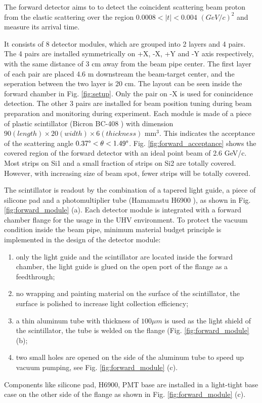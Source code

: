 \documentclass[number,5p]{elsarticle}
\begin{document}
The forward detector aims to to detect the coincident scattering beam proton
from the elastic scattering over the region \(0.0008 < |t| < 0.004\)
\((GeV/c)^2\) and measure its arrival time.

It consists of 8 detector modules, which are grouped into 2 layers and 4 pairs.
The 4 pairs are installed symmetrically on +X, -X, +Y and -Y axis respectively, with the same distance of 3
cm away from the beam pipe center.
The first layer of each pair are placed 4.6 m downstream the
beam-target center, and the seperation between the two layer is 20 cm.
The layout can be seen inside the forward chamber in Fig. \ref{fig:setup}.
Only the pair on -X is used for conincidence detection.
The other 3 pairs are installed for beam position tuning during beam preparation and monitoring during experiment.
Each module is made of a piece of plastic scintillator (Bicron BC-408
\cite{bc408}) with dimension \(90 (length) \times 20 (width) \times 6 (thickness)\) mm$^3$.
This indicates the acceptance of the scattering angle \(0.37\degree < \theta < 1.49\degree\).
Fig. \ref{fig:forward_acceptance} shows the covered region of the forward detector with an ideal point beam of 2.6 GeV/c.
Most strips on Si1 and a small fraction of strips on Si2 are totally covered. However, with increasing size of beam spot, fewer strips will be totally covered.

The scintillator is readout by the combination of a tapered light guide, a piece of silicone pad and a
photomultiplier tube (Hamamastu H6900 \cite{hamamatsu}), as shown in Fig. \ref{fig:forward_module} (a).
Each detector module is integrated with a forward chamber flange for the usage
in the UHV environment.
To protect the vacuum condition inside the beam pipe, minimum material budget principle is implemented in the design of the detector module:
\begin{enumerate}
\item only the light guide and the scintillator are located inside the forward chamber, the light guide is glued on the open port of the flange as a feedthrough;
\item no wrapping and painting material on the surface of the scintillator, the surface is polished to increase light collection efficiency;
\item a thin aluminum tube with thickness of \(100 \mu m\) is used as the light shield of the scintillator, the tube is welded on the flange (Fig. \ref{fig:forward_module} (b);
\item two small holes are opened on the side of the aluminum tube to speed up vacuum pumping, see Fig. \ref{fig:forward_module} (c).
\end{enumerate}
Components like silicone pad, H6900, PMT base are installed in a light-tight base case on the other side of the flange as shown in Fig. \ref{fig:forward_module} (c).
\end{document}
